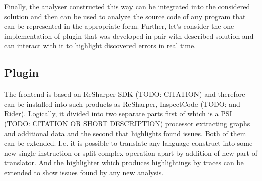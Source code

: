 Finally, the analyser constructed this way can be integrated into the considered solution and then can be used to analyze the source code of any program that can be represented in the appropriate form.
Further, let's consider the one implementation of plugin that was developed in pair with described solution and can interact with it to highlight discovered errors in real time.

\subsection{Plugin}

The frontend is based on ReSharper SDK (TODO: CITATION) and therefore can be installed into such products as ReSharper, InspectCode (TODO: and Rider).
Logically, it divided into two separate parts first of which is a PSI (TODO: CITATION OR SHORT DESCRIPTION) processor extracting graphs and additional data and the second that highlights found issues.
Both of them can be extended.
I.e. it is possible to translate any language construct into some new single instruction or split complex operation apart by addition of new part of translator.
And the highlighter which produces highlightings by traces can be extended to show issues found by any new analysis.

